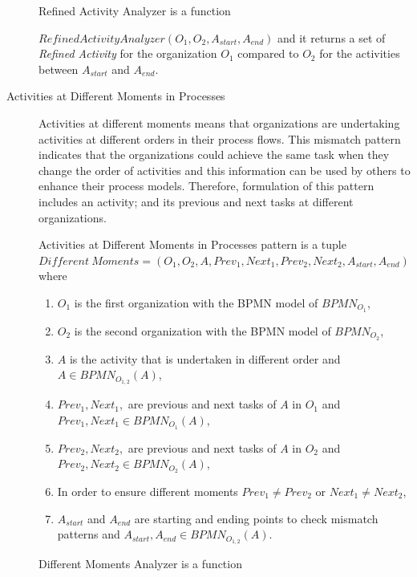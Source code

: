 \begin{description}
		\theoremstyle{definition}
		\begin{definition}
		Refined Activity Analyzer is a function 

		$RefinedActivityAnalyzer(O_{1}, O_{2}, A_{start}, A_{end})$ and it returns a set of \textit{Refined Activity} for the organization $O_{1}$ compared to $O_{2}$ for the activities between $A_{start}$ and $A_{end}$.
		\end{definition}

   \item[Activities at Different Moments in Processes] Activities at different moments means that organizations are undertaking activities at different orders in their process flows. This mismatch pattern indicates that the organizations could achieve the same task when they change the order of activities and this information can be used by others to enhance their process models. Therefore, formulation of this pattern includes an activity; and its previous and next tasks at different organizations.
		\theoremstyle{definition}
		\begin{definition}
		Activities at Different Moments in Processes pattern is a tuple ${Different\ Moments} = (O_{1}, O_{2}, A, Prev_{1}, Next_{1},Prev_{2}, Next_{2}, A_{start}, A_{end}) $ where 
		\begin{enumerate}
		  \item $O_{1}$ is the first organization with the BPMN model of $BPMN_{{O}_{1}}$,
		  \item $O_{2}$ is the second organization with the BPMN model of $BPMN_{{O}_{2}}$,
		  \item $A$ is the activity that is undertaken in different order and $A \in BPMN_{{O}_{1,2}}(A)$,
		  \item $Prev_{1}, Next_{1},$ are previous and next tasks of $A$ in $O_{1}$ and  $Prev_{1}, Next_{1} \in  BPMN_{{O}_{1}}(A)$,
  		  \item $Prev_{2}, Next_{2},$ are previous and next tasks of $A$ in $O_{2}$ and  $Prev_{2}, Next_{2} \in  BPMN_{{O}_{2}}(A)$,
  		  \item In order to ensure different moments $Prev_{1} \neq Prev_{2}$ or $Next_{1} \neq Next_{2}$,
 		  \item $A_{start}$ and $A_{end}$ are starting and ending points to check mismatch patterns and $A_{start}, A_{end} \in BPMN_{{O}_{1,2}}(A)$. 
		\end{enumerate}
		\end{definition}

		\theoremstyle{definition}
		\begin{definition}
		Different Moments Analyzer is a function 


\end{definition}
\end{description}

